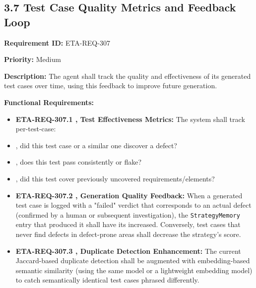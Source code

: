 \subsection*{3.7 Test Case Quality Metrics and Feedback Loop}

\textbf{Requirement ID:} ETA-REQ-307

\textbf{Priority:} Medium

\textbf{Description:}
The agent shall track the quality and effectiveness of its generated test cases over time, using this feedback to improve future generation.

\textbf{Functional Requirements:}

\begin{itemize}[leftmargin=1.4em,itemsep=1pt,topsep=3pt]
  \item \textbf{ETA-REQ-307.1 ,  Test Effectiveness Metrics:} The system shall track per-test-case:
  \item {} ,  did this test case or a similar one discover a defect?
  \item {} ,  does this test pass consistently or flake?
  \item {} ,  did this test cover previously uncovered requirements/elements?
\end{itemize}

\begin{itemize}[leftmargin=1.4em,itemsep=1pt,topsep=3pt]
  \item \textbf{ETA-REQ-307.2 ,  Generation Quality Feedback:} When a generated test case is logged with a "failed" verdict that corresponds to an actual defect (confirmed by a human or subsequent investigation), the \texttt{StrategyMemory} entry that produced it shall have its  increased. Conversely, test cases that never find defects in defect-prone areas shall decrease the strategy's score.
\end{itemize}

\begin{itemize}[leftmargin=1.4em,itemsep=1pt,topsep=3pt]
  \item \textbf{ETA-REQ-307.3 ,  Duplicate Detection Enhancement:} The current Jaccard-based duplicate detection shall be augmented with embedding-based semantic similarity (using the same model or a lightweight embedding model) to catch semantically identical test cases phrased differently.
\end{itemize}

